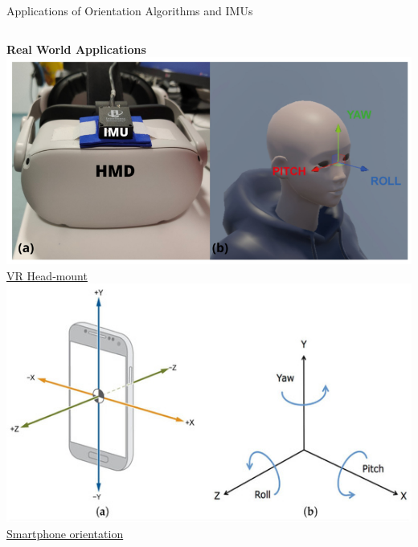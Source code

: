 \documentclass[aspectratio=169,xcolor=dvipsnames]{beamer}
\begin{document}
\begin{frame}{Applications of Orientation Algorithms and IMUs}
\tiny
\begin{columns}[T, totalwidth=\textwidth]

  \begin{column}{0.48\textwidth}
    \centering
    \textbf{Real World Applications} \\[0.5em]

    \includegraphics[height=0.2\textheight]{logos/a-Inertial-measurement-unit-IMU-placed-over-the-head-mounted-display-HMD-b.png}\\[0.2em]
    \href{https://www.mdpi.com/1424-8220/23/6/3077}{VR Head‐mount} \\[0.5em]

    \includegraphics[height=0.2\textheight]{logos/smartphone.jpg}\\[0.2em]
    \href{https://www.mdpi.com/1424-8220/24/15/4769}{Smartphone orientation} \\[0.5em]


\end{column}
\end{columns}
\end{frame}
\end{document}
